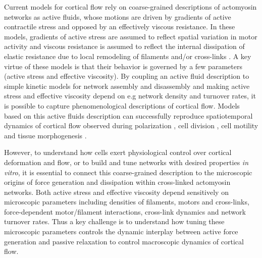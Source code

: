 Current models for cortical flow rely on coarse-grained descriptions of actomyosin networks as active fluids, whose motions are driven by gradients of active contractile stress and opposed by an effectively viscous resistance\cite{cellmech_flows}.  In these models, gradients of active stress are assumed to reflect spatial variation in motor activity and viscous resistance is assumed to reflect the internal dissipation of elastic resistance due to local remodeling of filaments and/or cross-links \cite{PhysRevLett.106.028103}.  A key virtue of these models is that their behavior is governed by a few parameters (active stress and effective viscosity).  By coupling an active fluid description to simple kinetic models for network assembly and disassembly and making active stress and effective viscosity depend on e.g network density and turnover rates, it is possible to capture phenomenological descriptions of cortical flow.  Models based on this active fluids description can successfully reproduce spatiotemporal dynamics of cortical flow observed during polarization \cite{cellmech_flows}, cell division \cite{Turlier2014114,PhysRevLett.103.058102}, cell motility \cite{Keren:2009aa,RevModPhys.85.1143} and tissue morphogenesis \cite{Heisenberg2013948}.  

However, to understand how cells exert physiological control over cortical deformation and flow, or to build and tune networks with desired properties {\em in vitro}, it is essential to connect this coarse-grained description to the microscopic origins of force generation and dissipation within cross-linked actomyosin networks.  Both active stress and effective viscosity depend sensitively on microscopic parameters including densities of filaments, motors and cross-links, force-dependent motor/filament interactions, cross-link dynamics and network turnover rates.  Thus a key challenge is to understand how tuning these microscopic parameters controls the dynamic interplay between active force generation and passive relaxation to control macroscopic dynamics of cortical flow.

